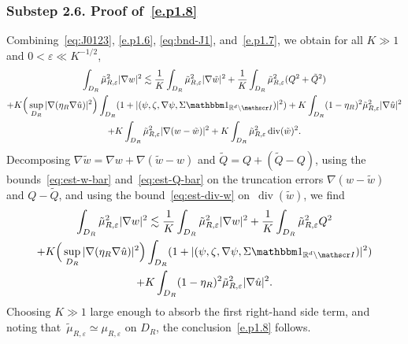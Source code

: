 \documentclass[10pt]{amsart}
\let\mathcal\mathscr
\let\mathds\mathbbm
\theoremstyle{plain}
\theoremstyle{definition}
\newcommand{\e}{\varepsilon}
\newcommand{\R}{\mathbb R}
\newcommand{\Ic}{\mathcal I}
\newcommand{\Div}{{\operatorname{div}}}
\newcommand{\substep}[1]{\subsubsection*{Substep #1}}
\begin{document}
\substep{2.6. Proof of~\eqref{e.p1.8}}
Combining~\eqref{eq:J0123}, \eqref{e.p1.6}, \eqref{eq:bnd-J1}, and~\eqref{e.p1.7}, we obtain for all $K\gg1$ and $0<\e\ll K^{-1/2}$,
\begin{multline*}
\int_{D_R} \tilde \mu_{R,\e}^2|\nabla w|^2
\lesssim \frac1K\int_{D_R}\tilde\mu_{R,\e}^2|\nabla\tilde w|^2
+\frac1K\int_{D_R}\tilde\mu_{R,\e}^2( Q^2+\tilde Q^2)\\
+K\Big(\sup_{D_R}|\nabla(\eta_R\nabla\hat u)|^2\Big)\int_{D_R}(1+|(\psi,\zeta,\nabla\psi,\Sigma\mathds1_{\R^d\setminus\Ic})|^2)
+K\int_{D_R}(1-\eta_R)^2\tilde\mu_{R,\e}^2|\nabla\hat u|^2\\
+K\int_{D_R} \tilde \mu_{R,\e}^2|\nabla(w-\tilde w)|^2
+K\int_{D_R} \tilde \mu_{R,\e}^2\,\Div(\tilde w)^2.
\end{multline*}
Decomposing $\nabla\tilde w=\nabla w+\nabla(\tilde w-w)$ and $\tilde Q=Q+(\tilde Q-Q)$, using the bounds~\eqref{eq:est-w-bar} and~\eqref{eq:est-Q-bar} on the truncation errors $\nabla(w-\tilde w)$ and $Q-\tilde Q$, and using the bound~\eqref{eq:est-div-w} on~$\Div(\tilde w)$, we find
\begin{multline*}
\int_{D_R} \tilde \mu_{R,\e}^2|\nabla w|^2
\lesssim \frac1K\int_{D_R}\tilde\mu_{R,\e}^2|\nabla w|^2
+\frac1K\int_{D_R}\tilde\mu_{R,\e}^2Q^2\\
+K\Big(\sup_{D_R}|\nabla(\eta_R\nabla\hat u)|^2\Big)\int_{D_R}(1+|(\psi,\zeta,\nabla\psi,\Sigma\mathds1_{\R^d\setminus\Ic})|^2)\\
+K\int_{D_R}(1-\eta_R)^2\tilde\mu_{R,\e}^2|\nabla\hat u|^2.
\end{multline*}
Choosing $K\gg1$ large enough to absorb the first right-hand side term, and noting that~$\tilde\mu_{R,\e}\simeq\mu_{R,\e}$ on $D_R$, the conclusion~\eqref{e.p1.8} follows.
\end{document}
